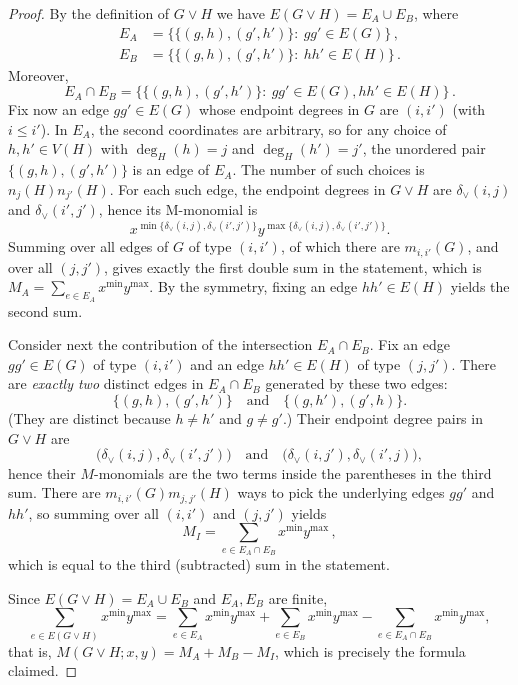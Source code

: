 \documentclass[10pt,a4paper]{amsart}
\begin{document}
\begin{proof}
By the definition of $G\vee H$ we have $E(G\vee H)=E_A\cup E_B$, 
where
\begin{align*}
E_A & = \bigl\{\{(g,h),(g',h')\}:\ gg'\in E(G)\bigr\}\,, \\
E_B & = \bigl\{\{(g,h),(g',h')\}:\ hh'\in E(H)\bigr\}\,.
\end{align*}
Moreover,
\[
E_A\cap E_B
=\bigl\{\{(g,h),(g',h')\}:\ gg'\in E(G), hh'\in E(H)\bigr\}\,.
\]
Fix now an edge $gg'\in E(G)$ whose endpoint degrees in $G$ are $(i,i')$ (with $i\le i'$).
In $E_A$, the second coordinates are arbitrary, so for any choice of
$h,h'\in V(H)$ with $\deg_H(h)=j$ and $\deg_H(h')=j'$, the unordered pair
$\{(g,h),(g',h')\}$ is an edge of $E_A$.
The number of such choices is $n_j(H) n_{j'}(H)$.
For each such edge, the endpoint degrees in $G\vee H$ are
$\delta_\vee(i,j)$ and $\delta_\vee(i',j')$, hence its M-monomial is
\[
x^{\min\{\delta_\vee(i,j),\delta_\vee(i',j')\}}
y^{\max\{\delta_\vee(i,j),\delta_\vee(i',j')\}}.
\]
Summing over all edges of $G$ of type $(i,i')$, of which there are $m_{i,i'}(G)$,
and over all $(j,j')$, gives exactly the first double sum in the statement, which is
$M_A=\sum_{e\in E_A}x^{\min}y^{\max}$. By the symmetry, fixing an edge $hh'\in E(H)$ yields the second sum. 

Consider next the contribution of the intersection $E_A\cap E_B$. 
Fix an edge $gg'\in E(G)$ of type $(i,i')$ and an edge $hh'\in E(H)$ of type $(j,j')$.
There are \emph{exactly two} distinct edges in $E_A\cap E_B$ generated by these two edges:
\[
\{(g,h),(g',h')\}
\quad\text{and}\quad
\{(g,h'),(g',h)\}.
\]
(They are distinct because $h\neq h'$ and $g\neq g'$.)
Their endpoint degree pairs in $G\vee H$ are
\[
\bigl(\delta_\vee(i,j),\delta_\vee(i',j')\bigr)
\quad\text{and}\quad
\bigl(\delta_\vee(i,j'),\delta_\vee(i',j)\bigr),
\]
hence their $M$-monomials are the two terms inside the parentheses in the third sum.
There are $m_{i,i'}(G)m_{j,j'}(H)$ ways to pick the underlying edges $gg'$ and $hh'$,
so summing over all $(i,i')$ and $(j,j')$ yields
\[
M_I=\sum_{e\in E_A\cap E_B}x^{\min}y^{\max}\,,
\]
which is equal to the third (subtracted) sum in the statement.

Since $E(G\vee H)=E_A\cup E_B$ and $E_A,E_B$ are finite,
\[
\sum_{e\in E(G\vee H)}x^{\min}y^{\max}
=
\sum_{e\in E_A}x^{\min}y^{\max}
+
\sum_{e\in E_B}x^{\min}y^{\max}
-
\sum_{e\in E_A\cap E_B}x^{\min}y^{\max},
\]
that is, $M(G\vee H;x,y)=M_A+M_B-M_I$, which is precisely the formula claimed.
\qedhere
\end{proof}
\end{document}
